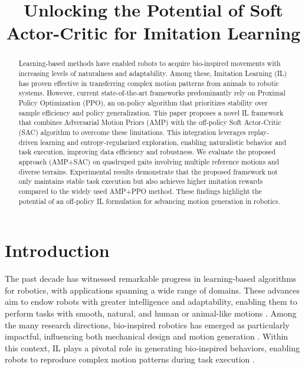 \documentclass[letterpaper, 10pt, conference]{IEEEtran}
\begin{document}
\title{Unlocking the Potential of Soft Actor-Critic for Imitation Learning}

\author{
}

\maketitle

\begin{abstract}
Learning-based methods have enabled robots to acquire bio-inspired movements with increasing levels of naturalness and adaptability. Among these, Imitation Learning (IL) has proven effective in transferring complex motion patterns from animals to robotic systems. However, current state-of-the-art frameworks predominantly rely on Proximal Policy Optimization (PPO), an on-policy algorithm that prioritizes stability over sample efficiency and policy generalization. This paper proposes a novel IL framework that combines Adversarial Motion Priors (AMP) with the off-policy Soft Actor-Critic (SAC) algorithm to overcome these limitations. This integration leverages replay-driven learning and entropy-regularized exploration, enabling naturalistic behavior and task execution, improving data efficiency and robustness. We evaluate the proposed approach (AMP+SAC) on quadruped gaits involving multiple reference motions and diverse terrains. Experimental results demonstrate that the proposed framework not only maintains stable task execution but also achieves higher imitation rewards compared to the widely used AMP+PPO method. These findings highlight the potential of an off-policy IL formulation for advancing motion generation in robotics.
\end{abstract}

\IEEEpeerreviewmaketitle

\section{Introduction}

The past decade has witnessed remarkable progress in learning-based algorithms for robotics, with applications spanning a wide range of domains. These advances aim to endow robots with greater intelligence and adaptability, enabling them to perform tasks with smooth, natural, and human or animal-like motions \cite{Tong2024, Qin2025, Akgun2024}. Among the many research directions, bio-inspired robotics has emerged as particularly impactful, influencing both mechanical design and motion generation \cite{Zhang2024}. Within this context, IL plays a pivotal role in generating bio-inspired behaviors, enabling robots to reproduce complex motion patterns during task execution \cite{Budiarto2024}.
\end{document}
